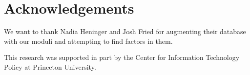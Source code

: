 \section*{Acknowledgements}
We want to thank Nadia Heninger and Josh Fried for augmenting their database
with our moduli and attempting to find factors in them.

This research was supported in part by the Center for Information Technology
Policy at Princeton University.
